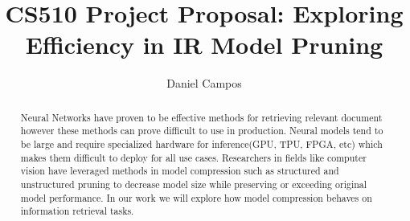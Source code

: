 \documentclass[sigplan,screen]{acmart}
\begin{document}
\title{CS510 Project Proposal: Exploring Efficiency in IR Model Pruning}


\author{Daniel Campos}

\begin{abstract}
Neural Networks have proven to be effective methods for retrieving relevant document however these methods can prove difficult to use in production. Neural models tend to be large and require specialized hardware for inference(GPU, TPU, FPGA, etc) which makes them difficult to deploy for all use cases. Researchers in fields like computer vision have leveraged methods in model compression such as structured and unstructured pruning to decrease model size while preserving or exceeding original model performance. In our work we will explore how model compression behaves on information retrieval tasks.   
\end{abstract}
\maketitle
\end{document}
